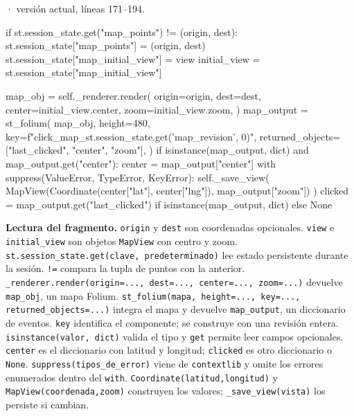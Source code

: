 \documentclass[11pt,a4paper]{article}
\begin{document}
\smallskip
{\footnotesize\texttt{} · versión actual, líneas 171--194.}\par
\begin{Codigo}[firstnumber=171]
        if st.session_state.get("map_points") != (origin, dest):
            st.session_state["map_points"] = (origin, dest)
            st.session_state["map_initial_view"] = view
        initial_view = st.session_state["map_initial_view"]

        map_obj = self._renderer.render(
            origin=origin,
            dest=dest,
            center=initial_view.center,
            zoom=initial_view.zoom,
        )
        map_output = st_folium(
            map_obj,
            height=480,
            key=f"click_map_{st.session_state.get('map_revision', 0)}",
            returned_objects=["last_clicked", "center", "zoom"],
        )
        if isinstance(map_output, dict) and map_output.get("center"):
            center = map_output["center"]
            with suppress(ValueError, TypeError, KeyError):
                self._save_view(
                    MapView(Coordinate(center["lat"], center["lng"]), map_output["zoom"])
                )
        clicked = map_output.get("last_clicked") if isinstance(map_output, dict) else None
\end{Codigo}

\textbf{Lectura del fragmento.} \texttt{origin} y \texttt{dest} son coordenadas opcionales. \texttt{view} e \texttt{initial\_view} son objetos \texttt{MapView} con centro y zoom. \texttt{st.session\_state.get(clave, predeterminado)} lee estado persistente durante la sesión. \texttt{!=} compara la tupla de puntos con la anterior. \texttt{\_renderer.render(origin=..., dest=..., center=..., zoom=...)} devuelve \texttt{map\_obj}, un mapa Folium. \texttt{st\_folium(mapa, height=..., key=..., returned\_objects=...)} integra el mapa y devuelve \texttt{map\_output}, un diccionario de eventos. \texttt{key} identifica el componente; se construye con una revisión entera. \texttt{isinstance(valor, dict)} valida el tipo y \texttt{get} permite leer campos opcionales. \texttt{center} es el diccionario con latitud y longitud; \texttt{clicked} es otro diccionario o \texttt{None}. \texttt{suppress(tipos\_de\_error)} viene de \texttt{contextlib} y omite los errores enumerados dentro del \texttt{with}. \texttt{Coordinate(latitud,longitud)} y \texttt{MapView(coordenada,zoom)} construyen los valores; \texttt{\_save\_view(vista)} los persiste si cambian.
\end{document}
